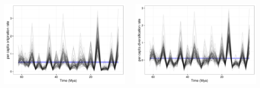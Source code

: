 \documentclass{beamer}
\begin{document}
\begin{frame}
\begin{columns}
\begin{column}{0.5\textwidth}
\begin{center}
        \includegraphics[height=0.4\textheight,width=\textwidth,keepaspectratio=true]{figure/orig_rate}
      \end{center}
    \end{column}
    \begin{column}{0.5\textwidth}
      \begin{center}
        \includegraphics[height=0.4\textheight,width=\textwidth,keepaspectratio=true]{figure/div_rate}


\end{center}
\end{column}
\end{columns}
\end{frame}
\end{document}
